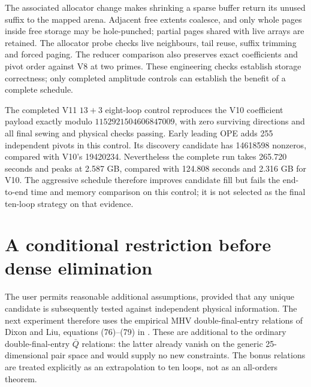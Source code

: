\documentclass[11pt]{article}
\begin{document}
The associated allocator change makes shrinking a sparse buffer return its
unused suffix to the mapped arena. Adjacent free extents coalesce, and only
whole pages inside free storage may be hole-punched; partial pages shared
with live arrays are retained. The allocator probe checks live neighbours,
tail reuse, suffix trimming and forced paging. The reducer comparison also
preserves exact coefficients and pivot order against V8 at two primes.
These engineering checks establish storage correctness; only completed
amplitude controls can establish the benefit of a complete schedule.

The completed V11 $13+3$ eight-loop control reproduces the V10 coefficient
payload exactly modulo $1152921504606847009$, with zero surviving directions
and all final sewing and physical checks passing. Early leading OPE adds
255 independent pivots in this control. Its discovery candidate has
14618598 nonzeros, compared with V10's 19420234. Nevertheless the complete
run takes 265.720 seconds and peaks at 2.587 GB, compared with 124.808 seconds
and 2.316 GB for V10. The aggressive schedule therefore improves candidate
fill but fails the end-to-end time and memory comparison on this control;
it is not selected as the final ten-loop strategy on that evidence.

\section{A conditional restriction before dense elimination}
The user permits reasonable additional assumptions, provided that any unique
candidate is subsequently tested against independent physical information.
The next experiment therefore uses the empirical MHV double-final-entry
relations of Dixon and Liu, equations (76)--(79) in \cite{dixonliu}. These
are additional to the ordinary double-final-entry $\bar Q$ relations:
the latter already vanish on the generic 25-dimensional pair space and
would supply no new constraints. The bonus relations are treated explicitly
as an extrapolation to ten loops, not as an all-orders theorem.
\end{document}

